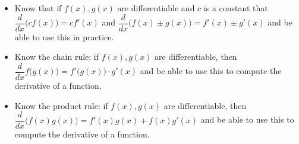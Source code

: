 \documentclass[11pt,letterpaper]{article}
\DeclareMathOperator{\arccsc}{arccsc}
\DeclareMathOperator{\arcsec}{arcsec}
\DeclareMathOperator{\arccot}{arccot}
\begin{document}
\begin{itemize}

\item Know that if $f(x), g(x)$ are differentiable and $c$ is a constant that $\dfrac{d}{dx} \big( cf(x) \big)= c f'(x)$ and $\dfrac{d}{dx} \big( f(x) \pm g(x) \big)= f'(x) \pm g'(x)$ and be able to use this in practice. 

\item Know the chain rule: if $f(x), g(x)$ are differentiable, then $\dfrac{d}{dx} f \big( g(x) \big)= f' \big( g(x) \big) \cdot g'(x)$ and be able to use this to compute the derivative of a function. 

\item Know the product rule: if $f(x), g(x)$ are differentiable, then $\dfrac{d}{dx} \big( f(x) g(x) \big)= f'(x) g(x) + f(x) g'(x)$ and be able to use this to compute the derivative of a function. 


\end{itemize}
\end{document}
